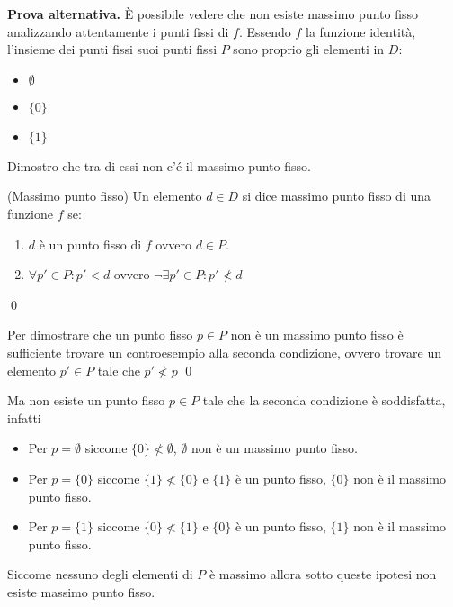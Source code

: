 \textbf{Prova alternativa.} È possibile vedere che non esiste massimo
punto fisso analizzando attentamente i punti fissi di $f$. Essendo $f$ la
funzione identità, l'insieme dei punti fissi suoi punti fissi $P$ sono proprio gli elementi in $D$:
\begin{itemize}
  \item $\emptyset$
  \item $\{0\}$
  \item $\{1\}$
\end{itemize}
Dimostro che tra di essi non c'é il massimo punto fisso.
\begin{mydef}(Massimo punto fisso)
Un elemento $d \in D$ si dice massimo punto fisso di una funzione $f$ se:
\begin{enumerate}
	\item $d$ è un punto fisso di $f$ ovvero $d \in P$.
	\item $\forall p' \in P: p' \lt d$ ovvero $\neg \exists p' \in P : p' \not \lt d$
\end{enumerate}
\qed
\end{mydef}
\begin{Oss}
	Per dimostrare che un punto fisso $p \in P$ non è un massimo punto fisso è sufficiente trovare un controesempio alla 
	seconda condizione, ovvero trovare un elemento $p' \in P$ tale che $p' \not \lt p$
\qed
\end{Oss}

Ma non esiste un punto fisso $p \in P$ tale che la seconda condizione è soddisfatta, infatti
\begin{itemize}
	\item Per $\boxed{p = \emptyset}$ siccome $\{0\} \not \lt \emptyset$, $\emptyset$ non è un massimo punto fisso.
	\item Per $\boxed{p = \{0\}}$ siccome $\{1\} \not \lt \{0\}$ e $\{1\}$ è un punto fisso, $\{0\}$ non è il massimo punto fisso.
	\item Per $\boxed{p = \{1\}}$ siccome $\{0\} \not \lt \{1\}$ e $\{0\}$ è un punto fisso, $\{1\}$ non è il massimo punto fisso.
\end{itemize}
Siccome nessuno degli elementi di $P$ è massimo allora sotto queste ipotesi non esiste massimo punto fisso.
\cvd
